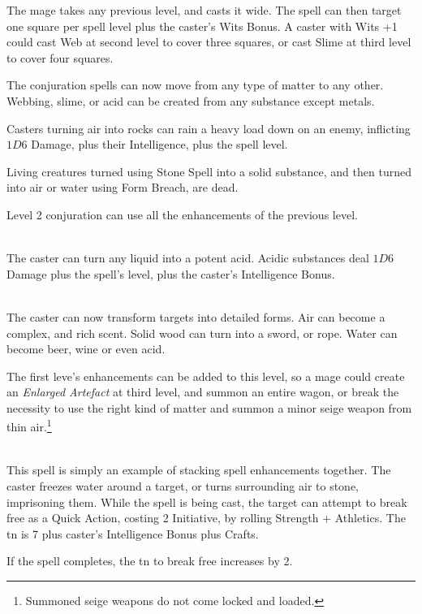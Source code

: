 \documentclass[titlepage,a4paper,openany]{book}
\begin{document}
\begin{multicols}{2}
 The mage takes any previous level, and casts it wide.  The spell can then target one square per spell level plus the caster's Wits Bonus.  A caster with Wits +1 could cast Web at second level to cover three squares, or cast Slime at third level to cover four squares.

 The conjuration spells can now move from any type of matter to any other.  Webbing, slime, or acid can be created from any substance except metals.

Casters turning air into rocks can rain a heavy load down on an enemy, inflicting $1D6$ Damage, plus their Intelligence, plus the spell level.

Living creatures turned using Stone Spell into a solid substance, and then turned into air or water using Form Breach, are dead.

\spelllevel

Level 2 conjuration can use all the enhancements of the previous level.

\\
The caster can turn any liquid into a potent acid.  Acidic substances deal $1D6$ Damage plus the spell's level, plus the caster's Intelligence Bonus.

\\
The caster can now transform targets into detailed forms.  Air can become a complex, and rich scent.  Solid wood can turn into a sword, or rope.  Water can become beer, wine or even acid.

The first leve's enhancements can be added to this level, so a mage could create an \textit{Enlarged Artefact} at third level, and summon an entire wagon, or break the necessity to use the right kind of matter and summon a minor seige weapon from thin air.\footnote{Summoned seige weapons do not come locked and loaded.}

\\
This spell is simply an example of stacking spell enhancements together.  The caster freezes water around a target, or turns surrounding air to stone, imprisoning them.
While the spell is being cast, the target can attempt to break free as a Quick Action, costing 2 Initiative, by rolling Strength + Athletics.
The \gls{tn} is 7 plus caster's Intelligence Bonus plus Crafts.

If the spell completes, the \gls{tn} to break free increases by 2.


\end{multicols}
\end{document}
